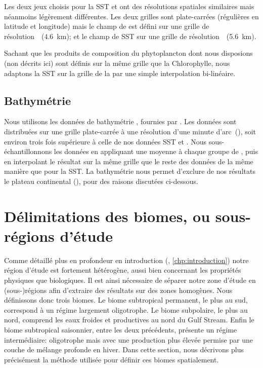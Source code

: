 Les deux jeux choisis pour la SST et  ont des résolutions spatiales similaires mais néanmoins légèrement différentes.
Les deux grilles sont plate-carrées (régulières en latitude et longitude) mais le champ de  est défini sur une grille  de résolution~~(\tapprox\qty{4.6}{\km}); et le champ de SST sur une grille  de résolution~~(\tapprox\qty{5.6}{\km}).

Sachant que les produits de composition du phytoplancton dont nous disposions (non décrits ici) sont définis sur la même grille que la Chlorophylle, nous adaptons la SST sur la grille de la  par une simple interpolation bi-linéaire.

\subsection{Bathymétrie}
\label{sec:donnees-bathymetrie}

Nous utilisons les données de bathymétrie , fournies par .
Les données sont distribuées sur une grille plate-carrée à une résolution d'une minute d'arc~(), soit environ trois fois supérieure à celle de nos données SST et .
Nous sous-échantillonnons les données en appliquant une moyenne à chaque groupe de , puis en interpolant le résultat sur la même grille que le reste des données de la même manière que pour la SST.
La bathymétrie nous permet d'exclure de nos résultats le plateau continental (), pour des raisons discutées ci-dessous.

\begin{figure}
  \centering
  \label{fig:bathymetrie}
\end{figure}

\section{Délimitations des biomes, ou sous-régions d'étude}
\label{sec:delimitations-regions}

Comme détaillé plus en profondeur en introduction (, \cref*{chp:introduction}) notre région d'étude est fortement hétérogène, aussi bien concernant les propriétés physiques que biologiques.
Il est ainsi nécessaire de séparer notre zone d'étude en (sous-)régions afin d'extraire des résultats sur des zones homogènes.
Nous définissons donc trois biomes.
Le biome subtropical permanent, le plus au sud, correspond à un régime largement oligotrophe.
Le biome subpolaire, le plus au nord, comprend les eaux froides et productives au nord du Gulf Stream.
Enfin le biome subtropical saisonnier, entre les deux précédents, présente un régime intermédiaire: oligotrophe mais avec une production plus élevée permise par une couche de mélange profonde en hiver.
Dans cette section, nous décrivons plus précisément la méthode utilisée pour définir ces biomes spatialement.

